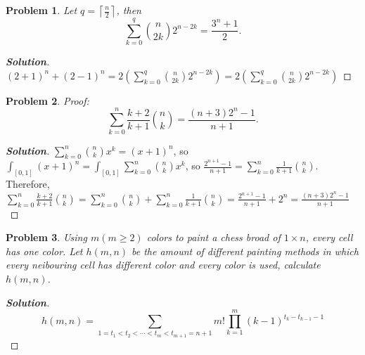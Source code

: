 \documentclass{ctexart}
\newtheorem{problem}{\textbf{Problem}}
\newenvironment{solution}{\begin{proof}[\textbf{Solution}]}{\end{proof}}
\renewcommand{\(}{\left(}
\renewcommand{\)}{\right)}
\newcommand{\Cb}[2]{\binom{#1}{#2}}
\begin{document}
\begin{problem}
    Let $q=\left\lceil\frac{n}{2}\right\rceil$, then
$$
\sum_{k=0}^{q}\Cb{n}{2k}2^{n-2k}=\frac{3^n+1}{2} .
$$
\end{problem}
\begin{solution}
$(2+1)^n+(2-1)^n=2\(\sum_{k=0}^q\Cb{n}{2k}2^{n-2k}\)=2\(\sum_{k=0}^{q}\Cb{n}{2k}2^{n-2k}\)$
\end{solution}
\begin{problem}
    Proof:
$$
\sum_{k=0}^n \frac{k+2}{k+1}\Cb{n}{k}=\frac{(n+3) 2^n-1}{n+1} .
$$
\end{problem}
\begin{solution}
    $\sum_{k=0}^n\Cb{n}{k}x^k=(x+1)^n$, so $\int_{[0,1]}(x+1)^n=\int_{[0,1]}\sum_{k=0}^n\Cb{n}{k}x^k$, 
    so $\frac{2^{n+1}-1}{n+1}=\sum_{k=0}^n\frac{1}{k+1}\Cb{n}{k}$. 
    Therefore, $\sum_{k=0}^n\frac{k+2}{k+1}\Cb{n}{k}=\sum_{k=0}^n\Cb{n}{k}+\sum_{k=0}^n\frac{1}{k+1}\Cb{n}{k}=\frac{2^{n+1}-1}{n+1}+2^n=\frac{(n+3) 2^n-1}{n+1}$
\end{solution}
\begin{problem}
    Using $m(m \geq 2)$ colors to paint a chess broad of $1 \times n$, every cell has one color. Let $h(m, n)$ be the amount of different painting methods in which every neibouring cell has different color and every color is used, calculate $h(m, n)$.
\end{problem}
\begin{solution}
$$h(m,n)=\sum_{1=t_1<t_2<\cdots<t_m<t_{m+1}=n+1}m!\prod_{k=1}^m (k-1)^{t_{k}-t_{k-1}-1}$$
\end{solution}





















\iffalse

$5-3$. 
5-4. 
5-5. 
5-6. 
\fi
\end{document}

